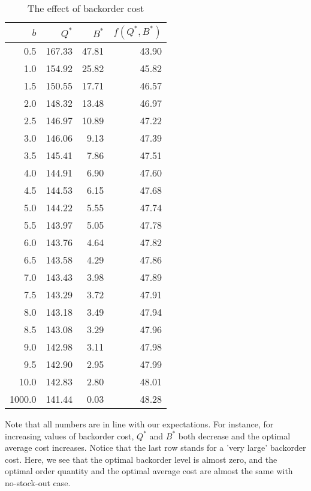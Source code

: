 \begin{solution}
\begin{table}[h]
  \centering
    \begin{tabular}{rrrr}
    \toprule
    $b$ & $Q^*$ & $B^*$ & $f(Q^*,B^*)$ \\
    \midrule
    0.5   & 167.33 & 47.81 & 43.90 \\
    1.0   & 154.92 & 25.82 & 45.82 \\
    1.5   & 150.55 & 17.71 & 46.57 \\
    2.0   & 148.32 & 13.48 & 46.97 \\
    2.5   & 146.97 & 10.89 & 47.22 \\
    3.0   & 146.06 & 9.13  & 47.39 \\
    3.5   & 145.41 & 7.86  & 47.51 \\
    4.0   & 144.91 & 6.90  & 47.60 \\
    4.5   & 144.53 & 6.15  & 47.68 \\
    5.0   & 144.22 & 5.55  & 47.74 \\
    5.5   & 143.97 & 5.05  & 47.78 \\
    6.0   & 143.76 & 4.64  & 47.82 \\
    6.5   & 143.58 & 4.29  & 47.86 \\
    7.0   & 143.43 & 3.98  & 47.89 \\
    7.5   & 143.29 & 3.72  & 47.91 \\
    8.0   & 143.18 & 3.49  & 47.94 \\
    8.5   & 143.08 & 3.29  & 47.96 \\
    9.0   & 142.98 & 3.11  & 47.98 \\
    9.5   & 142.90 & 2.95  & 47.99 \\
    10.0  & 142.83 & 2.80  & 48.01 \\
	1000.0	& 141.44 & 0.03	& 48.28 \\
    \bottomrule
    \end{tabular}%
   \caption{The effect of backorder cost}
  \label{tab:effect_backorder}%
\end{table}%

Note that all numbers are in line with our expectations. For instance, for increasing values of backorder cost, $Q^*$ and $B^*$ both decrease and the optimal average cost increases. Notice that the last row stands for a 'very large' backorder cost. Here, we see that the optimal backorder level is almost zero, and the optimal order quantity and the optimal average cost are almost the same with no-stock-out case. 
\end{solution}


